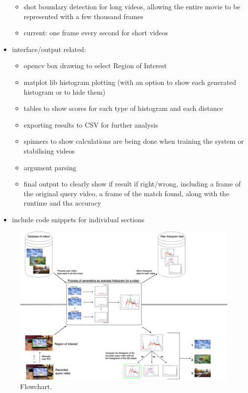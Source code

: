 \begin{itemize}
\begin{itemize}
            \item shot boundary detection for long videos, allowing the entire movie to be represented with a few thousand frames
            \item current: one frame every second for short videos
        \end{itemize}
    \item interface/output related: 
    \begin{itemize}
        \item opencv box drawing to select Region of Interest
        \item matplot lib histogram plotting (with an option to show each generated histogram or to hide them)
        \item tables to show scores for each type of histogram and each distance
        \item exporting results to CSV for further analysis
        \item spinners to show calculations are being done when training the system or stabilising videos 
        \item argument parsing
        \item final output to clearly show if result if right/wrong, including a frame of the original query video, a frame of the match found, along with the runtime and tha accuracy
    \end{itemize}
    \item include code snippets for individual sections
\end{itemize}

\begin{figure}[h] 
\centerline{\includegraphics[width=\textwidth]{figures/CBVR flowchart.png}}
\caption{\label{fig:CBVR flowchart}Flowchart.}
\end{figure}